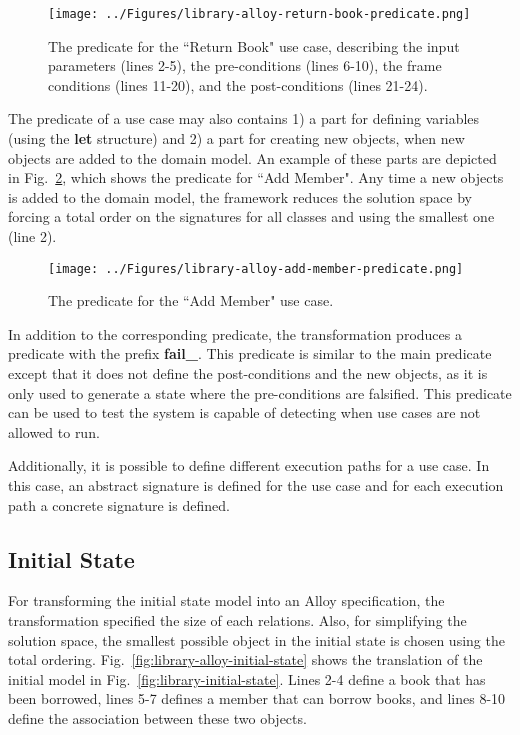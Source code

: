 \begin{figure}[h]
\centering
\texttt{[image: ../Figures/library-alloy-return-book-predicate.png]}
\caption{The predicate for the ``Return Book" use case, describing the input parameters (lines 2-5), the pre-conditions (lines 6-10), the frame conditions (lines 11-20), and the post-conditions (lines 21-24).}
\label{fig:library-alloy-return-book-predicate}
\end{figure}

The predicate of a use case may also contains 1) a part for defining variables (using the \textbf{let} structure) and 2) a part for creating new objects, when new objects are added to the domain model. An example of these parts are depicted in Fig.~\ref{fig:library-alloy-add-member-predicate}, which shows the predicate for ``Add Member". Any time a new objects is added to the domain model, the framework reduces the solution space by forcing a total order on the signatures for all classes and using the smallest one (line 2).

\begin{figure}[h]
\centering
\texttt{[image: ../Figures/library-alloy-add-member-predicate.png]}
\caption{The predicate for the ``Add Member" use case.}
\label{fig:library-alloy-add-member-predicate}
\end{figure}

In addition to the corresponding predicate, the transformation produces a predicate with the prefix \textbf{fail\_}. This predicate is similar to the main predicate except that it does not define the post-conditions and the new objects, as it is only used to generate a state where the pre-conditions are falsified. This predicate can be used to test the system is capable of detecting when use cases are not allowed to run.

Additionally, it is possible to define different execution paths for a use case. In this case, an abstract signature is defined for the use case and for each execution path a concrete signature is defined. 

\subsection{Initial State}
\label{sec:alloy-initial-state}
For transforming the initial state model into an Alloy specification, the transformation specified the size of each relations. Also, for simplifying the solution space, the smallest possible object in the initial state is chosen using the total ordering. Fig.~\ref{fig:library-alloy-initial-state} shows the translation of the initial model in Fig.~\ref{fig:library-initial-state}. Lines 2-4 define a book that has been borrowed, lines 5-7 defines a member that can borrow books, and lines 8-10 define the association between these two objects.

